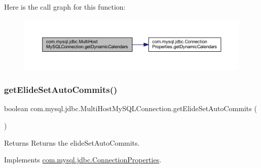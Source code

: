Here is the call graph for this function\+:
\nopagebreak
\begin{figure}[H]
\begin{center}
\leavevmode
\includegraphics[width=350pt]{classcom_1_1mysql_1_1jdbc_1_1_multi_host_my_s_q_l_connection_a680a95f48f0e52a86bcf911f209afaa3_cgraph}
\end{center}
\end{figure}
\mbox{\label{classcom_1_1mysql_1_1jdbc_1_1_multi_host_my_s_q_l_connection_a78b0a4ac4834370a985b18fd5f0d35a2}} 
\subsubsection{\texorpdfstring{get\+Elide\+Set\+Auto\+Commits()}{getElideSetAutoCommits()}}
{\footnotesize\ttfamily boolean com.\+mysql.\+jdbc.\+Multi\+Host\+My\+S\+Q\+L\+Connection.\+get\+Elide\+Set\+Auto\+Commits (\begin{DoxyParamCaption}{ }\end{DoxyParamCaption})}

\begin{DoxyReturn}{Returns}
Returns the elide\+Set\+Auto\+Commits. 
\end{DoxyReturn}


Implements \mbox{\hyperlink{interfacecom_1_1mysql_1_1jdbc_1_1_connection_properties_ad0c5071cd7d12eadb159a6b0cf8066c3}{com.\+mysql.\+jdbc.\+Connection\+Properties}}.

